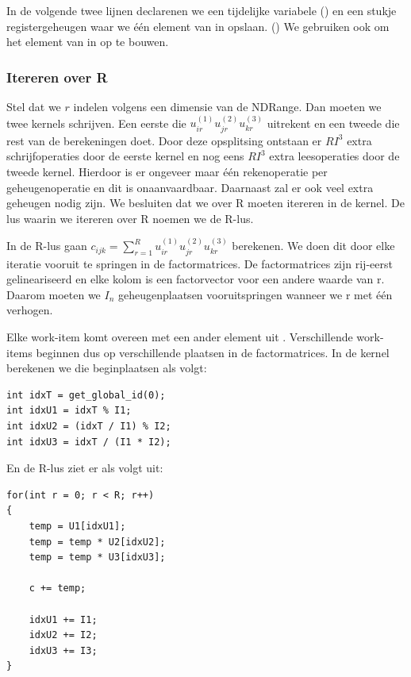 In de volgende twee lijnen declarenen we een tijdelijke variabele () en een stukje registergeheugen waar we \'e\'en element van \CC{} in opslaan. () We gebruiken  ook om het element van \CC{} in op te bouwen.

\subsubsection{Itereren over R}
Stel dat we $r$ indelen volgens een dimensie van de NDRange. Dan moeten we twee kernels schrijven. Een eerste die $u^{(1)}_{i r} u^{(2)}_{j r} u^{(3)}_{k r}$ uitrekent en een tweede die rest van de berekeningen doet. Door deze opsplitsing ontstaan er $RI^3$ extra schrijfoperaties door de eerste kernel en nog eens $RI^3$ extra leesoperaties door de tweede kernel. Hierdoor is er ongeveer maar \'e\'en rekenoperatie per geheugenoperatie en dit is onaanvaardbaar. Daarnaast zal er ook veel extra geheugen nodig zijn. We besluiten dat we over R moeten itereren in de kernel. De lus waarin we itereren over R noemen we de R-lus. 

In de R-lus gaan $c_{ijk} = \sum_{r=1}^{R} u^{(1)}_{i r} u^{(2)}_{j r} u^{(3)}_{k r}$ berekenen. We doen dit door elke iteratie vooruit te springen in de factormatrices. De factormatrices zijn rij-eerst gelineariseerd en elke kolom is een factorvector voor een andere waarde van r. Daarom moeten we $I_n$ geheugenplaatsen vooruitspringen wanneer we r  met \'e\'en verhogen.

Elke work-item komt overeen met een ander element uit \CC. Verschillende work-items beginnen dus op verschillende plaatsen in de factormatrices. In de kernel berekenen we die beginplaatsen als volgt:

\begin{lstlisting}
int idxT = get_global_id(0);
int idxU1 = idxT % I1;
int idxU2 = (idxT / I1) % I2;
int idxU3 = idxT / (I1 * I2);
\end{lstlisting}

En de R-lus ziet er als volgt uit:
\begin{lstlisting}
for(int r = 0; r < R; r++)
{
    temp = U1[idxU1];
    temp = temp * U2[idxU2];
    temp = temp * U3[idxU3];
    
    c += temp;
    
    idxU1 += I1;
    idxU2 += I2;
    idxU3 += I3;
}
\end{lstlisting}

